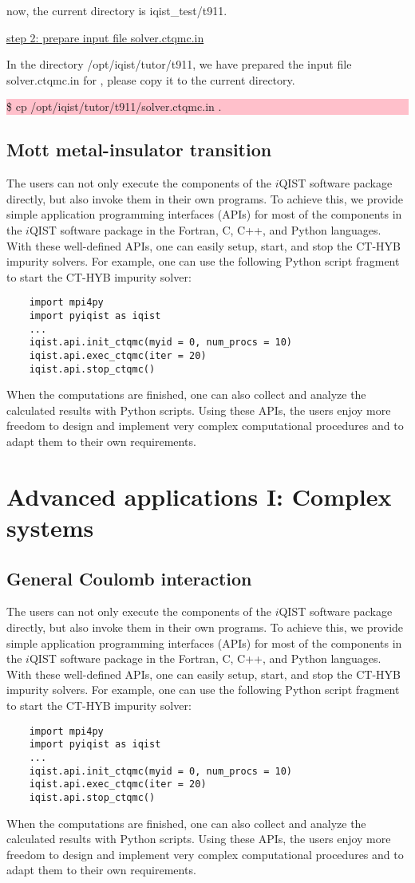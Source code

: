 now, the current directory is iqist\_test/t911.

\underline{step 2: prepare input file solver.ctqmc.in}

In the directory /opt/iqist/tutor/t911, we have prepared the input file solver.ctqmc.in for \azalea, please copy it to the current directory.

\noindent\colorbox{pink}{\parbox[r]{\linewidth}{\quad \$ cp /opt/iqist/tutor/t911/solver.ctqmc.in .}}

\subsection{Mott metal-insulator transition}
The users can not only execute the components of the $i$QIST software package directly, but also invoke them in their own programs. To achieve this, we provide simple application programming interfaces (APIs) for most of the components in the $i$QIST software package in the Fortran, C, C++, and Python languages. With these well-defined APIs, one can easily setup, start, and stop the CT-HYB impurity solvers. For example, one can use the following Python script fragment to start the CT-HYB impurity solver:
\begin{verbatim}
    import mpi4py
    import pyiqist as iqist
    ...
    iqist.api.init_ctqmc(myid = 0, num_procs = 10)
    iqist.api.exec_ctqmc(iter = 20)
    iqist.api.stop_ctqmc()
\end{verbatim}
When the computations are finished, one can also collect and analyze the calculated results with Python scripts. Using these APIs, the users enjoy more freedom to design and implement very complex computational procedures and to adapt them to their own requirements.

\section{Advanced applications I: Complex systems}
\subsection{General Coulomb interaction}
The users can not only execute the components of the $i$QIST software package directly, but also invoke them in their own programs. To achieve this, we provide simple application programming interfaces (APIs) for most of the components in the $i$QIST software package in the Fortran, C, C++, and Python languages. With these well-defined APIs, one can easily setup, start, and stop the CT-HYB impurity solvers. For example, one can use the following Python script fragment to start the CT-HYB impurity solver:
\begin{verbatim}
    import mpi4py
    import pyiqist as iqist
    ...
    iqist.api.init_ctqmc(myid = 0, num_procs = 10)
    iqist.api.exec_ctqmc(iter = 20)
    iqist.api.stop_ctqmc()
\end{verbatim}
When the computations are finished, one can also collect and analyze the calculated results with Python scripts. Using these APIs, the users enjoy more freedom to design and implement very complex computational procedures and to adapt them to their own requirements.
